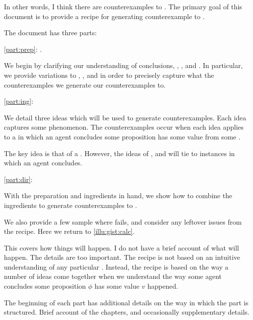 \begin{note}
  In other words, I think there are counterexamples to \issueInclusion{}.
  The primary goal of this document is to provide a recipe for generating counterexample to \issueInclusion{}.
\end{note}

\begin{note}
  The document has three parts:

  \begin{TOCEnum}
  \item
    \autoref{part:prep}: .

    We begin by clarifying our understanding of conclusions, \qWhy{}, \qHow{}, and \issueInclusion{}.
    In particular, we provide variations to \qWhy{}, \qHow{}, and \issueInclusion{} in order to precisely capture what the counterexamples we generate our counterexamples to.
  \item
    \autoref{part:ing}: 

    We detail three ideas which will be used to generate counterexamples.
    Each idea captures some phenomenon.
    The counterexamples occur when each idea applies to a  in which an agent concludes some proposition has some value from some \pool{}.

    The key idea is that of a \fc{}.
    However, the ideas of \tC{}, and \requ{} will tie  to instances in which an agent concludes.
  \item
    \autoref{part:dir}: 

    With the preparation and ingredients in hand, we show how to combine the ingredients to generate counterexamples to \issueInclusion{}.

    We also provide a few sample  where \issueInclusion{} fails, and consider any leftover issues from the recipe.
    Here we return to \autoref{illu:gist:calc}.
  \end{TOCEnum}

  This covers how things will happen.
  I do not have a brief account of what will happen.
  The details are too important.
  The recipe is not based on an intuitive understanding of any particular \scen{}.
  Instead, the recipe is based on the way a number of ideas come together when we understand the way some agent concludes some proposition \(\phi\) has some value \(v\) happened.

  The beginning of each part has additional details on the way in which the part is structured.
  Brief account of the chapters, and occasionally supplementary details.
\end{note}


